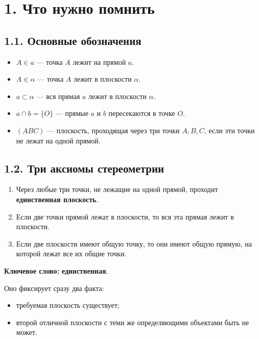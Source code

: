 \documentclass[a4paper,12pt]{article}
\newcommand{\term}[1]{\textbf{\textcolor{darkaccent}{#1}}}
\begin{document}
\section*{1. Что нужно помнить}

\subsection*{1.1. Основные обозначения}

\begin{itemize}
    \item $A\in a$ --- точка $A$ лежит на прямой $a$.
    \item $A\in\alpha$ --- точка $A$ лежит в плоскости $\alpha$.
    \item $a\subset\alpha$ --- вся прямая $a$ лежит в плоскости $\alpha$.
    \item $a\cap b=\{O\}$ --- прямые $a$ и $b$ пересекаются в точке $O$.
    \item $(ABC)$ --- плоскость, проходящая через три точки
    $A,B,C$, если эти точки не лежат на одной прямой.
\end{itemize}

\subsection*{1.2. Три аксиомы стереометрии}

\begin{enumerate}
    \item[\textbf{A1.}]
    Через любые три точки, не лежащие на одной прямой,
    проходит \term{единственная плоскость}.

    \item[\textbf{A2.}]
    Если две точки прямой лежат в плоскости,
    то вся эта прямая лежит в плоскости.

    \item[\textbf{A3.}]
    Если две плоскости имеют общую точку,
    то они имеют общую прямую, на которой лежат
    все их общие точки.
\end{enumerate}

\textbf{Ключевое слово:} \term{единственная}.

Оно фиксирует сразу два факта:

\begin{itemize}
    \item требуемая плоскость существует;
    \item второй отличной плоскости с теми же определяющими
    объектами быть не может.
\end{itemize}
\end{document}
